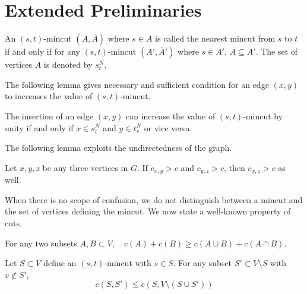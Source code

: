 \section{Extended Preliminaries} \label{appendix:extended-preliminaries}


\begin{definition}
An $(s,t)$-mincut $(A,{\bar A})$ where $s\in A$ is called the nearest mincut from $s$ to $t$ if and only if for any $(s,t)$-mincut $(A',{\bar A'})$ where $s \in A'$, $A\subseteq A'$. The set of vertices $A$ is denoted by $s_t^N$.
\label{def:nearest-s-t-mincut}
\end{definition}


The following lemma gives necessary and sufficient condition for an edge $(x,y)$ to increases the value of $(s,t)$-mincut.

\begin{lemma}
The insertion of an edge $(x, y)$ can increase the
value of $(s,t)$-mincut by unity if and only if $x\in s_t^N$ and $y\in t_s^N$ or vice versa.
\label{lem:edge-insertion-increases-mincut}
\end{lemma}

The following lemma exploits the undirectedness of the graph.
\begin{lemma}
Let $x,y,z$ be any three vertices in $G$. If $c_{x,y}>c$ and $c_{y,z}>c$, then $c_{x,z}>c$ as well. 
\label{lem:triangle-inequality}
\end{lemma}

When there is no scope of confusion, we do not distinguish between a mincut and the set of vertices defining the mincut. 
We now state a well-known property of cuts.
\begin{lemma}
For any two subsets $A,B\subset V$, ~
$ c(A) +c(B) \ge c(A\cup B) + c(A\cap B)$.
\label{lem:submodularity}
\end{lemma}


\begin{lemma}
Let $S \subset V$ define an $(s,t)$-mincut with $s\in S$. For any subset $S'\subset V\setminus S$ with $v\notin S'$,
\[ 
c(S,S') \le c(S,V\setminus (S\cup S'))
\]
\label{lem:subset-property-of-min-cut}
\end{lemma}


